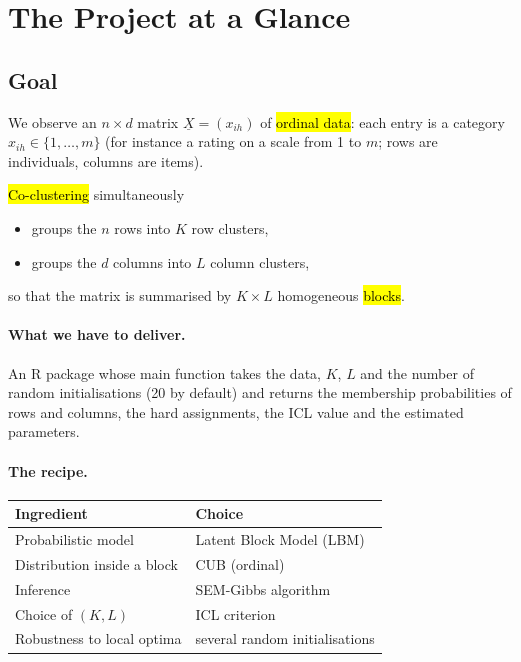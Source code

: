 \section{The Project at a Glance}

\subsection{Goal}

We observe an $n\times d$ matrix $\underline{X}=(x_{ih})$ of \hl{ordinal data}:
each entry is a category $x_{ih}\in\{1,\ldots,m\}$ (for instance a rating
on a scale from 1 to $m$; rows are individuals, columns are items).

\hl{Co-clustering} simultaneously
\begin{itemize}
  \item groups the $n$ rows into $K$ row clusters,
  \item groups the $d$ columns into $L$ column clusters,
\end{itemize}
so that the matrix is summarised by $K\times L$ homogeneous \hl{blocks}.

\paragraph{What we have to deliver.}
An R package whose main function takes the data, $K$, $L$ and the number
of random initialisations (20 by default) and returns
the membership probabilities of rows and columns, the hard assignments,
the ICL value and the estimated parameters.

\paragraph{The recipe.}
\begin{center}
\begin{tabular}{ll}
\toprule
Ingredient & Choice \\
\midrule
Probabilistic model & Latent Block Model (LBM) \\
Distribution inside a block & CUB (ordinal) \\
Inference & SEM-Gibbs algorithm \\
Choice of $(K,L)$ & ICL criterion \\
Robustness to local optima & several random initialisations \\
\bottomrule
\end{tabular}
\end{center}

